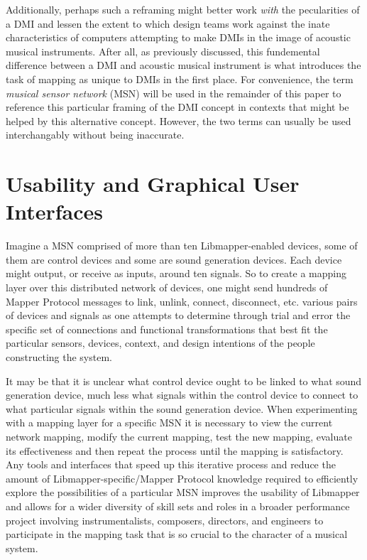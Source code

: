 Additionally, perhaps such a reframing might better work \emph{with} the pecularities of a DMI and lessen the extent to which design teams work against the inate characteristics of computers attempting to make DMIs in the image of acoustic musical instruments. After all, as previously discussed, this fundemental difference between a DMI and acoustic musical instrument is what introduces the task of mapping as unique to DMIs in the first place. For convenience, the term \emph{musical sensor network} (MSN) will be used in the remainder of this paper to reference this particular framing of the DMI concept in contexts that might be helped by this alternative concept. However, the two terms can usually be used interchangably without being inaccurate. 

\section{Usability and Graphical User Interfaces}

Imagine a MSN comprised of more than ten Libmapper-enabled devices, some of them are control devices and some are sound generation devices. Each device might output, or receive as inputs, around ten signals. So to create a mapping layer over this distributed network of devices, one might send hundreds of Mapper Protocol messages to link, unlink, connect, disconnect, etc. various pairs of devices and signals as one attempts to determine through trial and error the specific set of connections and functional transformations that best fit the particular sensors, devices, context, and design intentions of the people constructing the system. 

It may be that it is unclear what control device ought to be linked to what sound generation device, much less what signals within the control device to connect to what particular signals within the sound generation device. When experimenting with a mapping layer for a specific MSN it is necessary to view the current network mapping, modify the current mapping, test the new mapping, evaluate its effectiveness and then repeat the process until the mapping is satisfactory. Any tools and interfaces that speed up this iterative process and reduce the amount of Libmapper-specific/Mapper Protocol knowledge required to efficiently explore the possibilities of a particular MSN improves the usability of Libmapper and allows for a wider diversity of skill sets and roles in a broader performance project involving instrumentalists, composers, directors, and engineers to participate in the mapping task that is so crucial to the character of a musical system. 
